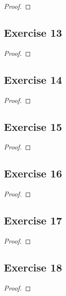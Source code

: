 \documentclass[14pt]{extarticle}
\begin{document}
\begin{proof}

\end{proof}

\subsection{Exercise 13}

\begin{proof}

\end{proof}

\subsection{Exercise 14}

\begin{proof}

\end{proof}

\subsection{Exercise 15}

\begin{proof}

\end{proof}

\subsection{Exercise 16}

\begin{proof}

\end{proof}

\subsection{Exercise 17}

\begin{proof}

\end{proof}

\subsection{Exercise 18}

\begin{proof}

\end{proof}
\end{document}
